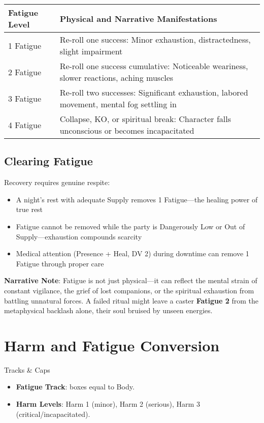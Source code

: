 \begin{fatebox}
\begin{tabularx}{\textwidth}{lX}
\toprule
\textbf{Fatigue Level} & \textbf{Physical and Narrative Manifestations} \\
\midrule
1 Fatigue & Re-roll one success: Minor exhaustion, distractedness, slight impairment \\
2 Fatigue & Re-roll one success cumulative: Noticeable weariness, slower reactions, aching muscles \\
3 Fatigue & Re-roll two successes: Significant exhaustion, labored movement, mental fog settling in \\
4 Fatigue & Collapse, KO, or spiritual break: Character falls unconscious or becomes incapacitated \\
\bottomrule
\end{tabularx}
\end{fatebox}

\subsection*{Clearing Fatigue}

Recovery requires genuine respite:

\begin{itemize}
    \item A night's rest with adequate Supply removes 1 Fatigue—the healing power of true rest
    \item Fatigue cannot be removed while the party is Dangerously Low or Out of Supply—exhaustion compounds scarcity
    \item Medical attention (Presence + Heal, DV 2) during downtime can remove 1 Fatigue through proper care
\end{itemize}

\textbf{Narrative Note}: Fatigue is not just physical---it can reflect the mental strain of constant vigilance, the grief of lost companions, or the spiritual exhaustion from battling unnatural forces. A failed ritual might leave a caster \textbf{Fatigue 2} from the metaphysical backlash alone, their soul bruised by unseen energies.

\section*{Harm and Fatigue Conversion}

Tracks \& Caps
\begin{itemize}
    \item \textbf{Fatigue Track}: boxes equal to Body.
    \item \textbf{Harm Levels}: Harm 1 (minor), Harm 2 (serious), Harm 3 (critical/incapacitated).
\end{itemize}

